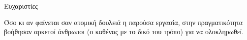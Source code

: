 \begin{center}
{\LARGE Ευχαριστίες}\\[1cm]
\end{center}

\setlength\parindent{24pt}Όσο κι αν φαίνεται σαν ατομική δουλειά η παρούσα εργασία, στην πραγματικότητα βοήθησαν αρκετοί άνθρωποι (ο καθένας με το δικό του τρόπο) για να ολοκληρωθεί. 